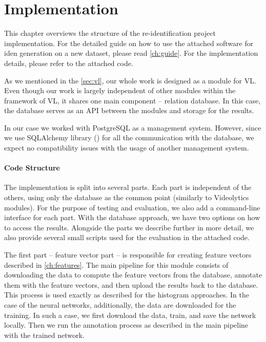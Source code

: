 \chapter{Implementation}

\label{ch:implementation}

This chapter overviews the structure of the re-identification project implementation. For the detailed guide on how to use the attached software for \gls{iden} generation on a new dataset, please read \autoref{ch:guide}. For the implementation details, please refer to the attached code.

As we mentioned in the \autoref{sec:vl}, our whole work is designed as a module for \gls{VL}. Even though our work is largely independent of other modules within the framework of \gls{VL}, it shares one main component -- relation database. In this case, the database serves as an API between the modules and storage for the results.

In our case we worked with PostgreSQL as a management system. However, since we use SQLAlchemy library (\cite{sqlalchemy}) for all the communication with the database, we expect no compatibility issues with the usage of another management system.

\subsubsection*{Code Structure}
The implementation is split into several parts. Each part is independent of the others, using only the database as the common point (similarly to Videolytics modules). For the purpose of testing and evaluation, we also add a command-line interface for each part. With the database approach, we have two options on how to access the results. 
Alongside the parts we describe further in more detail,  we also provide several small scripts used for the evaluation in the attached code.

The first part -- feature vector part -- is responsible for creating feature vectors described in \autoref{ch:features}. The main pipeline for this module consists of downloading the data to compute the feature vectors from the database, annotate them with the feature vectors, and then upload the results back to the database. This process is used exactly as described for the histogram approaches. In the case of the neural networks, additionally, the data are downloaded for the training. In such a case, we first download the data, train, and save the network locally. Then we run the annotation process as described in the main pipeline with the trained network.

